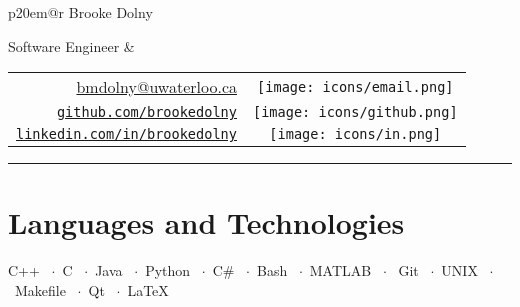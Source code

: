 \documentclass[oneside, 11pt]{memoir}
\newcommand{\TitleFont}[1]{\textnormal{\fontsize{30pt}{0}\selectfont #1}}
\newcommand{\lmr}[0]{\fontfamily{lmr}\selectfont} %
\newcommand{\LaTeXSkill}[0]{\lmr \LaTeX}
\newcommand{\spaceddot}[0]{~$\cdot$~}
\newcommand{\entrySkills}[2]{
  \begin{adjustwidth}{2.75em}{0em}%
  {\Merriweather \small #1}\spaceddot{\Merriweather \small #2}
  \end{adjustwidth}
  \vspace{-0.2em}
}
\newcommand{\github}{\texttt{[image: icons/github.png]}}
\newcommand{\linkedin}{\texttt{[image: icons/in.png]}}
\newcommand{\email}{\texttt{[image: icons/email.png]}}
\newcommand{\phone}{\texttt{[image: icons/phone.png]}}
\begin{document}
\color{textcolor}

\begin{tabular*}{\textwidth}{p{20em}@{\extracolsep{\fill}}r}%
  \TitleFont{\color{titlecolor} Brooke Dolny}

  {\textnormal{ Software Engineer}}
  &
  \begin{tabular}{rc}
    \url{bmdolny@uwaterloo.ca} & \email\\
    \href{https://github.com/brookedolny}{\texttt{github.com/brookedolny}} & \github\\
    \href{https://linkedin.com/in/brookedolny}{\texttt{linkedin.com/in/brookedolny}} & \linkedin
    \vspace{-0.08em}
    \end{tabular}%
\end{tabular*}
{\color{titlecolor} \rule{\textwidth}{0.1em}}


\section*{Languages and Technologies}
    \entrySkills{
        C++ \spaceddot C \spaceddot Java \spaceddot Python \spaceddot C\# \spaceddot Bash
        \spaceddot MATLAB
    }{
        Git \spaceddot UNIX \spaceddot Makefile \spaceddot Qt \spaceddot \LaTeXSkill
    }



\end{document}
